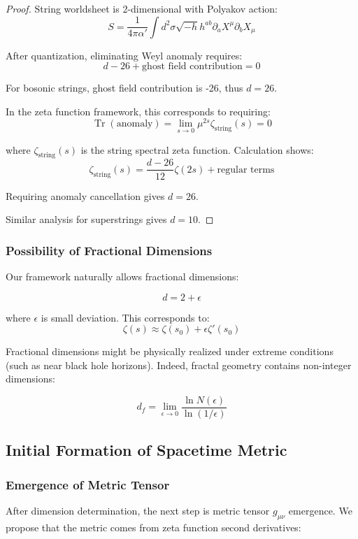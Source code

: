 \documentclass[12pt,a4paper]{article}
\DeclareMathOperator{\Tr}{Tr}
\begin{document}
\begin{proof}
String worldsheet is 2-dimensional with Polyakov action:
$$S = \frac{1}{4\pi\alpha'} \int d^2\sigma \sqrt{-h} h^{ab} \partial_a X^{\mu} \partial_b X_{\mu}$$

After quantization, eliminating Weyl anomaly requires:
$$d - 26 + \text{ghost field contribution} = 0$$

For bosonic strings, ghost field contribution is -26, thus $d = 26$.

In the zeta function framework, this corresponds to requiring:
$$\Tr(\text{anomaly}) = \lim_{s \to 0} \mu^{2s} \zeta_{\text{string}}(s) = 0$$

where $\zeta_{\text{string}}(s)$ is the string spectral zeta function. Calculation shows:
$$\zeta_{\text{string}}(s) = \frac{d-26}{12} \zeta(2s) + \text{regular terms}$$

Requiring anomaly cancellation gives $d = 26$.

Similar analysis for superstrings gives $d = 10$.
\end{proof}

\subsubsection{Possibility of Fractional Dimensions}

Our framework naturally allows fractional dimensions:

$$d = 2 + \epsilon$$

where $\epsilon$ is small deviation. This corresponds to:
$$\zeta(s) \approx \zeta(s_0) + \epsilon \zeta'(s_0)$$

Fractional dimensions might be physically realized under extreme conditions (such as near black hole horizons). Indeed, fractal geometry contains non-integer dimensions:

$$d_f = \lim_{\epsilon \to 0} \frac{\ln N(\epsilon)}{\ln(1/\epsilon)}$$

\subsection{Initial Formation of Spacetime Metric}

\subsubsection{Emergence of Metric Tensor}

After dimension determination, the next step is metric tensor $g_{\mu\nu}$ emergence. We propose that the metric comes from zeta function second derivatives:
\end{document}
